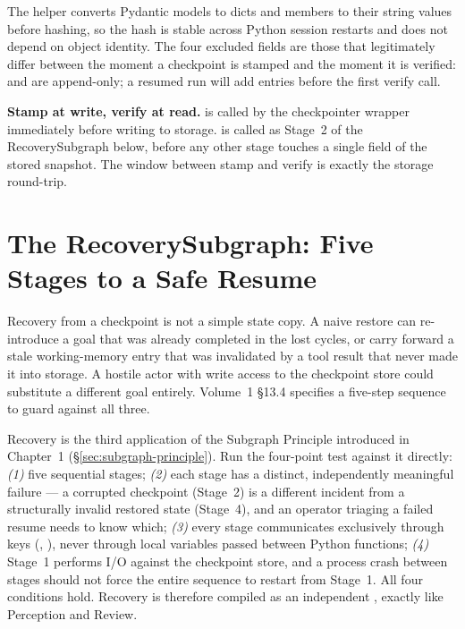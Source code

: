 \medskip
The  helper converts Pydantic models to dicts and
 members to their string values before hashing, so the hash is
stable across Python session restarts and does not depend on object
identity.  The four excluded fields are those that legitimately differ
between the moment a checkpoint is stamped and the moment it is verified:
 and  are append-only; a resumed
run will add entries before the first verify call.

\begin{notebox}
\textbf{Stamp at write, verify at read.}   is
called by the checkpointer wrapper immediately before writing to storage.
 is called as Stage~2 of the RecoverySubgraph
below, before any other stage touches a single field of the stored
snapshot.  The window between stamp and verify is exactly the storage
round-trip.
\end{notebox}

\section{The RecoverySubgraph: Five Stages to a Safe Resume}
\label{sec:recovery-subgraph}

Recovery from a checkpoint is not a simple state copy.  A naive restore
can re-introduce a goal that was already completed in the lost cycles, or
carry forward a stale working-memory entry that was invalidated by a tool
result that never made it into storage.  A hostile actor with write
access to the checkpoint store could substitute a different goal entirely.
Volume~1 §13.4 specifies a five-step sequence to guard against all three.

Recovery is the third application of the Subgraph Principle introduced in
Chapter~1 (\S\ref{sec:subgraph-principle}).  Run the four-point test
against it directly: \emph{(1)} five sequential stages; \emph{(2)} each
stage has a distinct, independently meaningful failure --- a corrupted
checkpoint (Stage~2) is a different incident from a structurally invalid
restored state (Stage~4), and an operator triaging a failed resume needs
to know which; \emph{(3)} every stage communicates exclusively through
 keys (,
), never through local variables passed between
Python functions; \emph{(4)} Stage~1 performs I/O against the checkpoint
store, and a process crash between stages should not force the entire
sequence to restart from Stage~1.  All four conditions hold.  Recovery is
therefore compiled as an independent , exactly
like Perception and Review.

